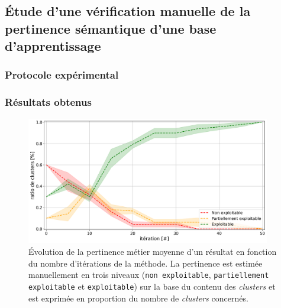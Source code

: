 	
	\subsection{Étude d'une vérification manuelle de la pertinence sémantique d'une base d'apprentissage}
	\label{section:4.4.1-ETUDE-PERTINENCE-VERIFICATION-MANUELLE}
	
		\subsubsection{Protocole expérimental}
		

		\subsubsection{Résultats obtenus}
		
			
			
			\begin{figure}[!htb]
				\centering
				\includegraphics[width=0.95\textwidth]{figures/etude-pertinence-llm-check-clustering-annotation-favori}
				\caption{Évolution de la pertinence métier moyenne d'un résultat en fonction du nombre d'itérations de la méthode.
				La pertinence est estimée manuellement en trois niveaux (\texttt{non exploitable}, \texttt{partiellement exploitable} et \texttt{exploitable}) sur la base du contenu des \textit{clusters} et est exprimée en proportion du nombre de \textit{clusters} concernés.}
				\label{figure:4.4.1-ETUDE-PERTINENCE-VERIFICATION-MANUELLE}
			\end{figure}

